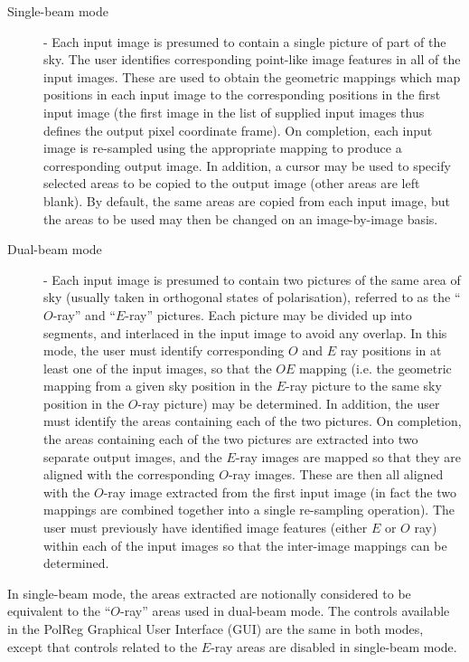 \begin {description}

\item [Single-beam mode] - Each input image is presumed to contain a
single picture of part of the sky. The user identifies corresponding
point-like image features in all of the input images. These are used to
obtain the geometric mappings which map positions in each input image to
the corresponding positions in the first input image (the first image in
the list of supplied input images thus defines the output pixel
coordinate frame). On completion, each input image is re-sampled using the
appropriate mapping to produce a corresponding output image. In addition,
a cursor may be used to specify selected areas to be copied to the
output image (other areas are left blank). By default, the same areas are
copied from each input image, but the areas to be used may then be
changed on an image-by-image basis.

\item [Dual-beam mode] - Each input image is presumed to contain two
pictures of the same area of sky (usually taken in orthogonal states of
polarisation), referred to as the ``$O$-ray'' and ``$E$-ray'' pictures.
Each picture may be divided up into segments, and interlaced in the input
image to avoid any overlap. In this mode, the user must identify
corresponding $O$ and $E$ ray positions in at least one of the input
images, so that the $OE$ mapping (i.e. the geometric mapping from a given
sky position in the $E$-ray picture to the same sky position in the
$O$-ray picture) may be determined. In addition, the user must identify
the areas containing each of the two pictures.  On completion, the areas
containing each of the two pictures are extracted into two separate
output images,
and the $E$-ray images are mapped so that they are aligned with the
corresponding $O$-ray images. These are then all aligned with the $O$-ray
image extracted from the first input image (in fact the two mappings are
combined together into a single re-sampling operation). The user must
previously have identified image features (either $E$ or $O$ ray) within
each of the input images so that the inter-image mappings can be determined.

\end {description}

In single-beam mode, the areas extracted are notionally considered to be 
equivalent to the ``$O$-ray'' areas used in dual-beam mode. The controls
available in the PolReg Graphical User Interface (GUI) are the same
in both modes, except that controls related to the $E$-ray areas are
disabled in single-beam mode.

